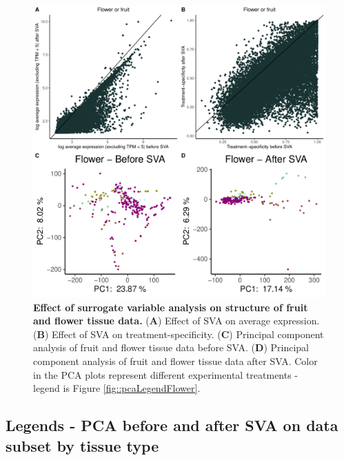 \documentclass[12pt]{article}
\begin{document}
\begin{figure}[H]
\centering
\includegraphics[width = \linewidth]{figures/appendix_a/pca_beforeAndAfterSva_flower_2023-02-21.pdf}
\caption{\textbf{Effect of surrogate variable analysis on structure of fruit and flower tissue data.} (\textbf{A}) Effect of SVA on average expression. (\textbf{B}) Effect of SVA on treatment-specificity. (\textbf{C}) Principal component analysis of fruit and flower tissue data before SVA. (\textbf{D}) Principal component analysis of fruit and flower tissue data after SVA. Color in the PCA plots represent different experimental treatments - legend is Figure \ref{fig::pcaLegendFlower}.}%
\end{figure}

\subsection*{Legends - PCA before and after SVA on data subset by tissue type}
\end{document}
